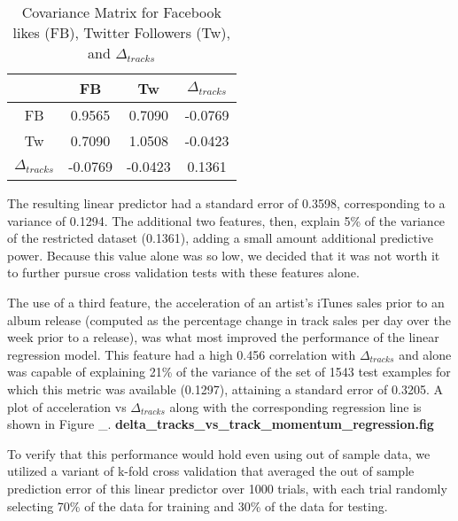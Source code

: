 \documentclass[conference]{IEEEtran}
\begin{document}
\begin{table}[!t]
\renewcommand{\arraystretch}{1.3}
\caption{Covariance Matrix for Facebook likes (FB), Twitter Followers (Tw), and $\Delta_{tracks}$}
\label{covariance_1}
\centering
\begin{tabular}{c|ccc}
 & FB & Tw & $\Delta_{tracks}$\\
\hline
FB & 0.9565 & 0.7090 & -0.0769\\
Tw & 0.7090 & 1.0508 & -0.0423\\
$\Delta_{tracks}$ & -0.0769 & -0.0423 & 0.1361
\end{tabular}
\end{table}

The resulting linear predictor had a standard error of 0.3598, corresponding to a variance of 0.1294. The additional two features, then, explain 5\% of the variance of the restricted dataset (0.1361), adding a small amount additional predictive power. Because this value alone was so low, we decided that it was not worth it to further pursue cross validation tests with these features alone.

The use of a third feature, the acceleration of an artist's iTunes sales prior to an album release (computed as the percentage change in track sales per day over the week prior to a release), was what most improved the performance of the linear regression model. This feature had a high 0.456 correlation with $\Delta_{tracks}$ and alone was capable of explaining 21\% of the variance of the set of 1543 test examples for which this metric was available (0.1297), attaining a standard error of 0.3205. A plot of acceleration vs $\Delta_{tracks}$ along with the corresponding regression line is shown in Figure \_. \textbf{delta\_tracks\_vs\_track\_momentum\_regression.fig}

To verify that this performance would hold even using out of sample data, we utilized a variant of k-fold cross validation that averaged the out of sample prediction error of this linear predictor over 1000 trials, with each trial randomly selecting 70\% of the data for training and 30\% of the data for testing.
\end{document}
